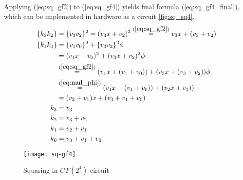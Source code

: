 Applying (\ref{eq:sq_gf2}) to (\ref{eq:sq_gf4}) yields final formula (\ref{eq:sq_gf4_final}), which can be implemented in hardware as a circuit \ref{fig:sq_sq4}.
\begin{equation}
\label{eq:sq_gf4_final}
\begin{aligned}
\{k_3k_2\} &= \{v_3v_2\}^2 = (v_3x + v_2)^2
\stackrel{(\ref{eq:sq_gf2})}{=}
v_3x + (v_3 + v_2)\\
\{k_1k_0\} &= \{v_1v_0\}^2 + \{v_3v_2\}^2\phi \\
&= (v_1x + v_0)^2 + (v_3x + v_2)^2\phi \\
&\stackrel{(\ref{eq:sq_gf2})}{=}
(v_1x + (v_1 + v_0)) + (v_3x + (v_3 + v_2))\phi \\
&\stackrel{(\ref{eq:mul_phi})}{=}
(v_1x + (v_1 + v_0)) + (v_2x + v_3)) \\
&= (v_2 + v_1)x + (v_3 + v_1 + v_0) \\
k_3 &= v_3 \\
k_2 &= v_3 + v_2 \\
k_1 &= v_2 + v_1 \\
k_0 &= v_3 + v_1 + v_0
\end{aligned}
\end{equation}

\begin{figure}[!h]
\label{fig:mul_sq4}
\centering
\texttt{[image: sq-gf4]}
\caption{Squaring in $GF(2^4)$ circuit}
\end{figure}
